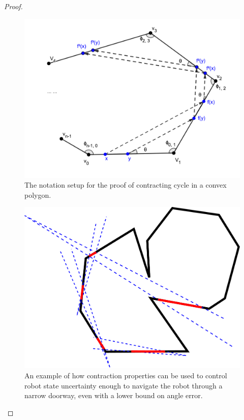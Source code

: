 \documentclass[]{styles/svproc}  %
\begin{document}
\begin{appendix}
\begin{proof}
\begin{figure}
    \includegraphics[width=0.6\linewidth]{figures/convex_cycle.png}
    \centering
    \caption{The notation setup for the proof of contracting cycle in a convex polygon.\label{fig:conv_cycle}}
    \centering
\end{figure}

\begin{figure}
    \includegraphics[width=0.6\linewidth]{figures/bounce_preimages.pdf}
    \centering
    \caption{An example of how contraction properties can be used to control
robot state uncertainty enough to navigate the robot through a narrow doorway,
even with a lower bound on angle error.}
\label{fig:preimage_example}
\end{figure}


\end{proof}

\end{appendix}
\end{document}
